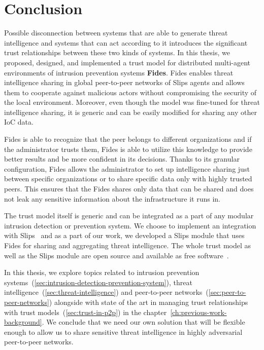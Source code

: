 \chapter{Conclusion}
\label{ch:conclusion}

Possible disconnection between systems that are able to generate threat intelligence and systems that can act according to it introduces the significant trust relationships between these two kinds of systems.
In this thesis, we proposed, designed, and implemented a trust model for distributed multi-agent environments of intrusion prevention systems \textbf{Fides}.
Fides enables threat intelligence sharing in global peer-to-peer networks of Slips agents and allows them to cooperate against malicious actors without compromising the security of the local environment. 
Moreover, even though the model was fine-tuned for threat intelligence sharing, it is generic and can be easily modified for sharing any other IoC data.

Fides is able to recognize that the peer belongs to different organizations and if the administrator trusts them, Fides is able to utilize this knowledge to provide better results and be more confident in its decisions.
Thanks to its granular configuration, Fides allows the administrator to set up intelligence sharing just between specific organizations or to share specific data only with highly trusted peers.
This ensures that the Fides shares only data that can be shared and does not leak any sensitive information about the infrastructure it runs in.

The trust model itself is generic and can be integrated as a part of any modular intrusion detection or prevention system. We choose to implement an integration with Slips~\cite{slips} and as a part of our work, we developed a Slips module that uses Fides for sharing and aggregating threat intelligence.
The whole trust model as well as the Slips module are open source and available as free software~\cite{fidesGithub}.

In this thesis, we explore topics related to intrusion prevention systems~(\ref{sec:intrusion-detection-prevention-system}), threat intelligence~(\ref{sec:threat-intelligence}) and peer-to-peer networks~(\ref{sec:peer-to-peer-networks}) alongside with state of the art in managing trust relationships with trust models~(\ref{sec:trust-in-p2p}) in the chapter~\ref{ch:previous-work-background}.
We conclude that we need our own solution that will be flexible enough to allow us to share sensitive threat intelligence in highly adversarial peer-to-peer networks.

